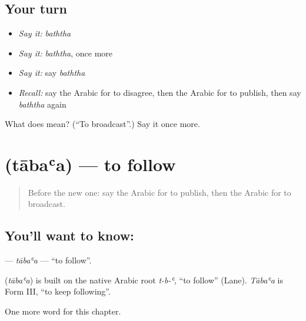 \subsection*{Your turn}
\begin{itemize}
\raggedright
  \item \emph{Say it:} \emph{baththa}
  \item \emph{Say it:} \emph{baththa}, once more
  \item \emph{Say it:} say \emph{baththa}
  \item \emph{Recall:} say the Arabic for to disagree, then the Arabic for to publish, then say \emph{baththa} again
\end{itemize}

\begin{tcolorbox}[breakable,colback=teal!4,colframe=teal!35!black,title={Before you move on}]
What does  mean? (\textquotedblleft{}To broadcast\textquotedblright{}.) Say it once more.
\end{tcolorbox}
\section[\texorpdfstring{\ar{تابع} (tābaʿa)}{تابع (tābaʿa)}]{ (tābaʿa) — to follow}

\label{lesson:AR-C259-tabaa2}



\begin{quote}
Before the new one: say the Arabic for to publish, then the Arabic for to broadcast.
\end{quote}

\subsection*{You'll want to know: }
\textbf{} — \emph{tābaʿa} — \textquotedblleft{}to follow\textquotedblright{}.

\begin{cousinweb}
\textbf{} (\emph{tābaʿa}) is built on the native Arabic root \emph{t-b-ʿ}, \textquotedblleft{}to follow\textquotedblright{} (Lane). \emph{Tābaʿa} is Form III, \textquotedblleft{}to keep following\textquotedblright{}.
\end{cousinweb}

\begin{grammarlens}[title={What you've built}]
One more word for this chapter.
\end{grammarlens}

